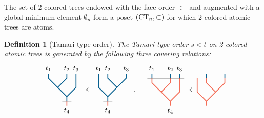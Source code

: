 \documentclass[10pt]{amsart}
\newtheorem{definition}{Definition}[section]
\theoremstyle{remark}
\begin{document}
The set of 2-colored trees endowed with the face order $\subset$ and augmented with a global minimum element $\emptyset_n$ form a poset $(\mathrm{CT}_{n}, \subset)$ for which 2-colored atomic trees are atoms.

\begin{definition}[Tamari-type order]\leavevmode
The \emph{Tamari-type order} $s<t$ on  2-colored atomic trees is generated by the following three covering relations: 
\[
{\vcenter{\hbox{
\begin{tikzpicture}[yscale=0.45,xscale=0.45]
\draw[very thick, MidnightBlue] (0,-0.5)--(0,0) -- (-2,2)--(-2,2.5);
\draw[very thick, MidnightBlue] (-1,1)--(0,2)--(0,2.5) ;
\draw[very thick, MidnightBlue] (0,0)--(1,1)--(1,2.5) ;
%
\draw[very thick, Red!60] (0,-0.5)--(0,-1) ;
%
\draw (-0.5,-0.5) --(0.5, -0.5);
%
\draw (-2,2.5) node[above] {$t_1$}; 
\draw (0,2.5) node[above] {$t_2$}; 
\draw (1,2.5) node[above] {$t_3$}; 
\draw (0,-1) node[below] {$t_4$}; 
\end{tikzpicture}}}}
\prec
{\vcenter{\hbox{
\begin{tikzpicture}[yscale=0.45,xscale=0.45]
\draw[very thick, MidnightBlue] (0,-0.5)--(0,0) -- (2,2)--(2,2.5);
\draw[very thick, MidnightBlue] (1,1)--(0,2)--(0,2.5) ;
\draw[very thick, MidnightBlue] (0,0)--(-1,1)--(-1,2.5) ;
%
\draw[very thick, Red!60] (0,-0.5)--(0,-1) ;
%
\draw (-0.5,-0.5) --(0.5, -0.5);
%
\draw (2,2.5) node[above] {$t_3$}; 
\draw (0,2.5) node[above] {$t_2$}; 
\draw (-1,2.5) node[above] {$t_1$}; 
\draw (0,-1) node[below] {$t_4$}; 
\end{tikzpicture}}}}\ , \quad 
{\vcenter{\hbox{
\begin{tikzpicture}[yscale=0.45,xscale=0.45]
\draw[very thick, MidnightBlue] (-2, 2.5)--(-2, 3) ;
\draw[very thick, MidnightBlue] (0, 2.5)--(0, 3) ;
\draw[very thick, MidnightBlue] (1, 2.5)--(1, 3) ;
%
\draw[very thick, Red!60] (0,-0.5)--(0,0) -- (-2,2)--(-2,2.5);
\draw[very thick, Red!60] (-1,1)--(0,2)--(0,2.5) ;
\draw[very thick, Red!60] (0,0)--(1,1)--(1,2.5) ;
%
\draw (-2.5,2.5) --(1.5, 2.5);
%
\draw (-2,3) node[above] {$t_1$}; 
\draw (0,3) node[above] {$t_2$}; 
\draw (1,3) node[above] {$t_3$}; 
\draw (0,-0.5) node[below] {$t_4$}; 
\end{tikzpicture}}}}
\prec
{\vcenter{\hbox{
\begin{tikzpicture}[yscale=0.45,xscale=0.45]
\draw[very thick, Red!60] (0,-0.5)--(0,0) -- (2,2)--(2,2.5);
\draw[very thick, Red!60] (1,1)--(0,2)--(0,2.5) ;
\draw[very thick, Red!60] (0,0)--(-1,1)--(-1,2.5) ;
%
\draw[very thick, MidnightBlue] (2,2.5)--(2,3) ;
\draw[very thick, MidnightBlue] (0,2.5)--(0,3) ;

\end{tikzpicture}}}}\]
\end{definition}
\end{document}
